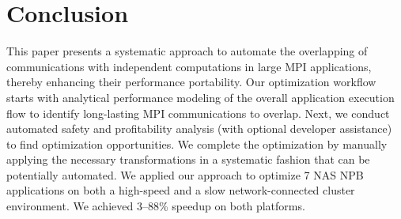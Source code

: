 \section{Conclusion}
\label{sec-concl}

This paper presents a systematic approach to automate the overlapping
of communications with independent computations in large MPI
applications, thereby enhancing their performance portability.  Our
optimization workflow starts with analytical performance modeling of
the overall application execution flow to identify long-lasting MPI
communications to overlap. Next, we conduct automated safety
and profitability analysis (with optional developer assistance) to find optimization opportunities. We
complete the optimization by manually applying the necessary
transformations in a systematic fashion that can be potentially
automated.  We applied our approach to optimize 7 NAS NPB applications
on both a high-speed and a slow network-connected cluster
environment. We achieved 3--88\% speedup on both platforms.
